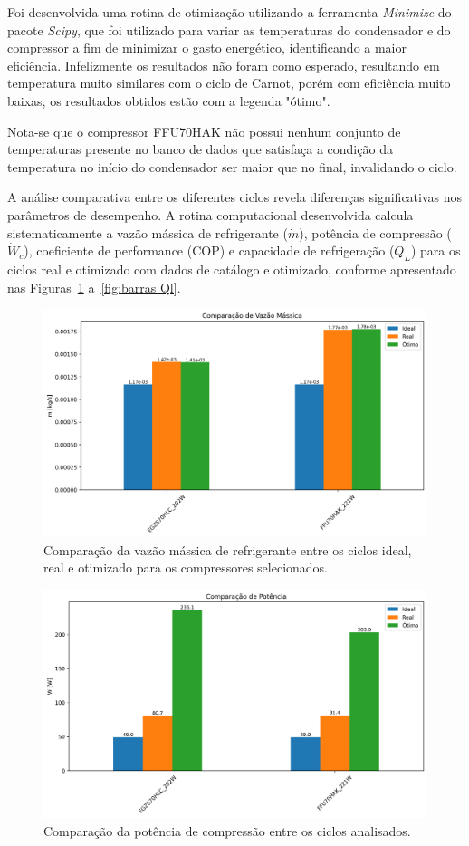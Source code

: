 Foi desenvolvida uma rotina de otimização utilizando a ferramenta \textit{Minimize} do pacote \textit{Scipy}, que foi utilizado para variar as temperaturas do condensador e do compressor a fim de minimizar o gasto energético, identificando a maior eficiência. Infelizmente os resultados não foram como esperado, resultando em temperatura muito similares com o ciclo de Carnot, porém com eficiência muito baixas, os resultados obtidos estão com a legenda "ótimo".

Nota-se que o compressor FFU70HAK não possui nenhum conjunto de temperaturas presente no banco de dados que satisfaça a condição da temperatura no início do condensador ser maior que no final, invalidando o ciclo.

A análise comparativa entre os diferentes ciclos revela diferenças significativas nos parâmetros de desempenho. A rotina computacional desenvolvida calcula sistematicamente a vazão mássica de refrigerante ($\dot{m}$), potência de compressão ($\dot{W}_c$), coeficiente de performance (COP) e capacidade de refrigeração ($\dot{Q}_L$) para os ciclos real e otimizado com dados de catálogo e otimizado, conforme apresentado nas Figuras~\ref{fig:barras fluxo massa} a~\ref{fig:barras Ql}.

\begin{figure}[ht]
    \centering
    \includegraphics[width=0.8\linewidth]{Imagens/Desenvolvimento/barras_m.png}
    \caption{Comparação da vazão mássica de refrigerante entre os ciclos ideal, real e otimizado para os compressores selecionados.}
    \label{fig:barras fluxo massa}
\end{figure}

\begin{figure}[ht]
    \centering
    \includegraphics[width=0.8\linewidth]{Imagens/Desenvolvimento/barras_W.png}
    \caption{Comparação da potência de compressão entre os ciclos analisados.}
    \label{fig:barras W}
\end{figure}


